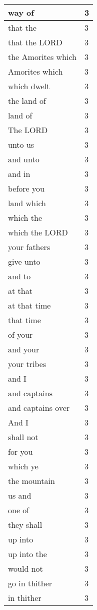 \begin{center}
\begin{longtable}{|p{3.0in}|p{0.5in}|}
way of & 3\\ \hline 
that the & 3\\ \hline 
that the LORD & 3\\ \hline 
the Amorites which & 3\\ \hline 
Amorites which & 3\\ \hline 
which dwelt & 3\\ \hline 
the land of & 3\\ \hline 
land of & 3\\ \hline 
The LORD & 3\\ \hline 
unto us & 3\\ \hline 
and unto & 3\\ \hline 
and in & 3\\ \hline 
before you & 3\\ \hline 
land which & 3\\ \hline 
which the & 3\\ \hline 
which the LORD & 3\\ \hline 
your fathers & 3\\ \hline 
give unto & 3\\ \hline 
and to & 3\\ \hline 
at that & 3\\ \hline 
at that time & 3\\ \hline 
that time & 3\\ \hline 
of your & 3\\ \hline 
and your & 3\\ \hline 
your tribes & 3\\ \hline 
and I & 3\\ \hline 
and captains & 3\\ \hline 
and captains over & 3\\ \hline 
And I & 3\\ \hline 
shall not & 3\\ \hline 
for you & 3\\ \hline 
which ye & 3\\ \hline 
the mountain & 3\\ \hline 
us and & 3\\ \hline 
one of & 3\\ \hline 
they shall & 3\\ \hline 
up into & 3\\ \hline 
up into the & 3\\ \hline 
would not & 3\\ \hline 
go in thither & 3\\ \hline 
in thither & 3\\ \hline 
\end{longtable}
\end{center}





